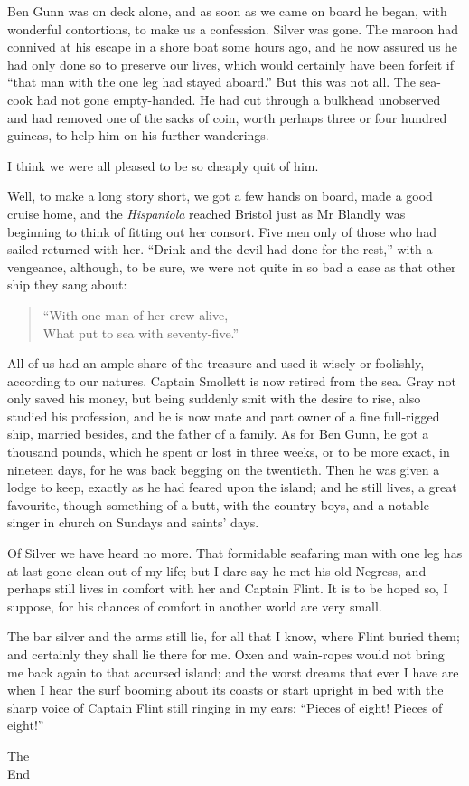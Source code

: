 Ben Gunn was on deck alone, and as soon as we came on board he began, with wonderful contortions, to make us a confession. Silver was gone. The maroon had connived at his escape in a shore boat some hours ago, and he now assured us he had only done so to preserve our lives, which would certainly have been forfeit if \enquote{that man with the one leg had stayed aboard.} But this was not all. The sea-cook had not gone empty-handed. He had cut through a bulkhead unobserved and had removed one of the sacks of coin, worth perhaps three or four hundred guineas, to help him on his further wanderings.

I think we were all pleased to be so cheaply quit of him.

Well, to make a long story short, we got a few hands on board, made a good cruise home, and the \textit{Hispaniola} reached Bristol just as Mr Blandly was beginning to think of fitting out her consort. Five men only of those who had sailed returned with her. \enquote{Drink and the devil had done for the rest,} with a vengeance, although, to be sure, we were not quite in so bad a case as that other ship they sang about:

\blockquote{
\enquote{With one man of her crew alive,\\
What put to sea with seventy-five.}
}

All of us had an ample share of the treasure and used it wisely or foolishly, according to our natures. Captain Smollett is now retired from the sea. Gray not only saved his money, but being suddenly smit with the desire to rise, also studied his profession, and he is now mate and part owner of a fine full-rigged ship, married besides, and the father of a family. As for Ben Gunn, he got a thousand pounds, which he spent or lost in three weeks, or to be more exact, in nineteen days, for he was back begging on the twentieth. Then he was given a lodge to keep, exactly as he had feared upon the island; and he still lives, a great favourite, though something of a butt, with the country boys, and a notable singer in church on Sundays and saints’ days.

Of Silver we have heard no more. That formidable seafaring man with one leg has at last gone clean out of my life; but I dare say he met his old Negress, and perhaps still lives in comfort with her and Captain Flint. It is to be hoped so, I suppose, for his chances of comfort in another world are very small.

The bar silver and the arms still lie, for all that I know, where Flint buried them; and certainly they shall lie there for me. Oxen and wain-ropes would not bring me back again to that accursed island; and the worst dreams that ever I have are when I hear the surf booming about its coasts or start upright in bed with the sharp voice of Captain Flint still ringing in my ears: \enquote{Pieces of eight! Pieces of eight!}
\begin{center}
{\HUGE\chapterfont The\\}
\vspace{0.5cm}
{\HUGE\chapterfont End}
\end{center}
